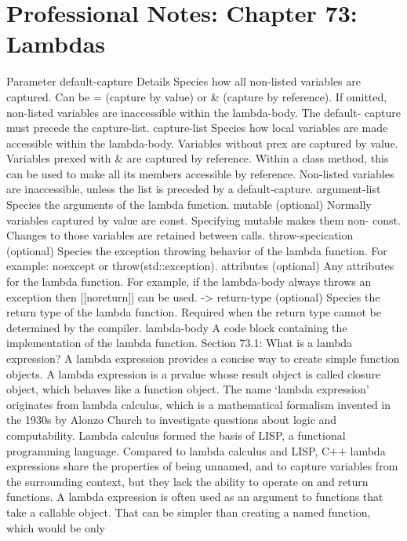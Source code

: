 \hypertarget{professional-notes-chapter-73-lambdas-1}{%
\section{Professional Notes: Chapter 73:
Lambdas}\label{professional-notes-chapter-73-lambdas-1}}

Parameter default-capture Details Species how all non-listed variables
are captured. Can be = (capture by value) or \& (capture by reference).
If omitted, non-listed variables are inaccessible within the
lambda-body. The default- capture must precede the capture-list.
capture-list Species how local variables are made accessible within the
lambda-body. Variables without prex are captured by value. Variables
prexed with \& are captured by reference. Within a class method, this
can be used to make all its members accessible by reference. Non-listed
variables are inaccessible, unless the list is preceded by a
default-capture. argument-list Species the arguments of the lambda
function. mutable (optional) Normally variables captured by value are
const. Specifying mutable makes them non- const. Changes to those
variables are retained between calls. throw-specication (optional)
Species the exception throwing behavior of the lambda function. For
example: noexcept or throw(std::exception). attributes (optional) Any
attributes for the lambda function. For example, if the lambda-body
always throws an exception then {[}{[}noreturn{]}{]} can be used.
-\textgreater{} return-type (optional) Species the return type of the
lambda function. Required when the return type cannot be determined by
the compiler. lambda-body A code block containing the implementation of
the lambda function. Section 73.1: What is a lambda expression? A lambda
expression provides a concise way to create simple function objects. A
lambda expression is a prvalue whose result object is called closure
object, which behaves like a function object. The name `lambda
expression' originates from lambda calculus, which is a mathematical
formalism invented in the 1930s by Alonzo Church to investigate
questions about logic and computability. Lambda calculus formed the
basis of LISP, a functional programming language. Compared to lambda
calculus and LISP, C++ lambda expressions share the properties of being
unnamed, and to capture variables from the surrounding context, but they
lack the ability to operate on and return functions. A lambda expression
is often used as an argument to functions that take a callable object.
That can be simpler than creating a named function, which would be only
